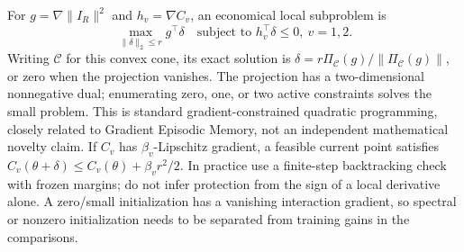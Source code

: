 For $g=\nabla\|I_R\|^2$ and $h_v=\nabla C_v$, an economical local subproblem is
\[
 \max_{\|\delta\|_2\le r}g^\top\delta
 \quad\text{subject to }h_v^\top\delta\le0,\ v=1,2.
\]
Writing $\mathcal C$ for this convex cone, its exact solution is
$\delta=r\Pi_{\mathcal C}(g)/\|\Pi_{\mathcal C}(g)\|$, or zero when the
projection vanishes. The projection has a two-dimensional nonnegative dual;
enumerating zero, one, or two active constraints solves the small problem.
This is standard gradient-constrained quadratic programming, closely related
to Gradient Episodic Memory, not an independent mathematical novelty claim.
If $C_v$ has $\beta_v$-Lipschitz gradient, a feasible current point satisfies
$C_v(\theta+\delta)\le C_v(\theta)+\beta_v r^2/2$.
In practice use a finite-step backtracking check with frozen margins; do not
infer protection from the sign of a local derivative alone. A zero/small
initialization has a vanishing interaction gradient, so spectral or nonzero
initialization needs to be separated from training gains in the comparisons.
